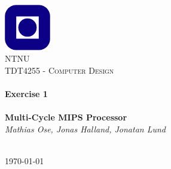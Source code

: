 \begin{titlepage}
\begin{center}
\includegraphics[width=0.15\textwidth]{img/NTNU.png}~\\[1cm]

\textsc{\LARGE NTNU}\\[1.5cm]

\textsc{\Large TDT4255 - Computer Design}\\[0.5cm]

\HRule \\[0.4cm]
{ \huge \bfseries Exercise 1 \\~\\  Multi-Cycle MIPS Processor}\\[0.5cm]
{\large \textit{Mathias Ose, Jonas Halland, Jonatan Lund}}\\[0.2cm]
\HRule \\[1.5cm]



\vfill

{\large \today}
\end{center}
\end{titlepage}
